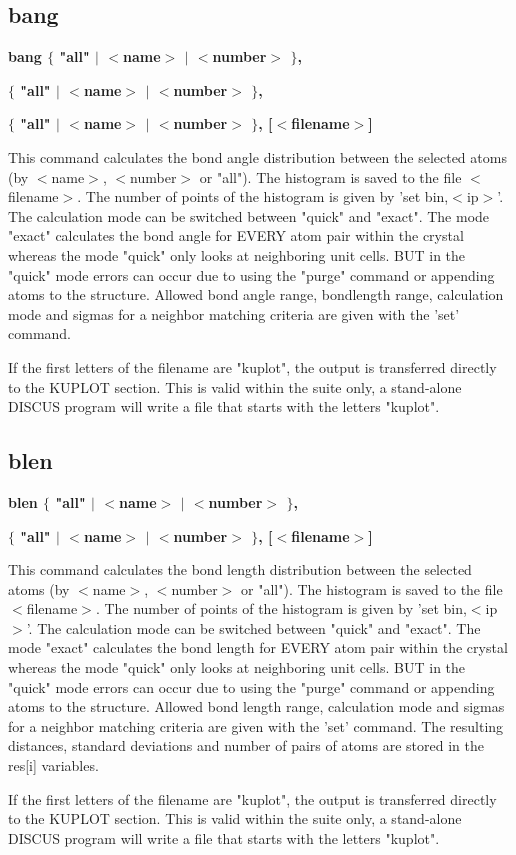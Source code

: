 \subsection*{bang}
{\bf bang $ \{$ "all" $| $ $ <$name$> $ $| $ $ <$number$> $ $\} $, \par }
{\bf      $ \{$ "all" $| $ $ <$name$> $ $| $ $ <$number$> $ $\} $, \par }
{\bf      $ \{$ "all" $| $ $ <$name$> $ $| $ $ <$number$> $ $\} $, [$ <$filename$> $] \par }
\par
\vspace{3pt}
This command calculates the bond angle distribution between the 
selected atoms (by $ <$name$> $, $ <$number$> $ or "all"). The histogram 
is saved to the file $ <$filename$> $. The number of points of the 
histogram is given by 'set bin,$ <$ip$> $'. The calculation mode 
can be switched between "quick" and "exact". The mode "exact" 
calculates the bond angle for EVERY atom pair within the crystal 
whereas the mode "quick" only looks at neighboring unit cells. 
BUT in the "quick" mode errors can occur due to using the "purge" 
command or appending atoms to the structure. 
Allowed bond angle range, bondlength range, calculation mode and 
sigmas for a neighbor matching criteria are given with the 
'set' command. 
\par
If the first letters of the filename are "kuplot", the output 
is transferred directly to the KUPLOT section. This is valid 
within the suite only, a stand-alone DISCUS program will write a 
file that starts with the letters "kuplot". 
\subsection*{blen}
{\bf blen $ \{$ "all" $| $ $ <$name$> $ $| $ $ <$number$> $ $\} $, \par }
{\bf      $ \{$ "all" $| $ $ <$name$> $ $| $ $ <$number$> $ $\} $, [$ <$filename$> $] \par }
\par
\vspace{3pt}
This command calculates the bond length distribution between the 
selected atoms (by $ <$name$> $, $ <$number$> $ or "all"). The histogram 
is saved to the file $ <$filename$> $. The number of points of the 
histogram is given by 'set bin,$ <$ip$> $'. The calculation mode 
can be switched between "quick" and "exact". The mode "exact" 
calculates the bond length for EVERY atom pair within the crystal 
whereas the mode "quick" only looks at neighboring unit cells. 
BUT in the "quick" mode errors can occur due to using the "purge" 
command or appending atoms to the structure. 
Allowed bond length range, calculation mode and sigmas for a neighbor 
matching criteria are given with the 'set' command. 
The resulting distances, standard deviations and number of pairs 
of atoms are stored in the res[i] variables. 
\par
If the first letters of the filename are "kuplot", the output 
is transferred directly to the KUPLOT section. This is valid 
within the suite only, a stand-alone DISCUS program will write a 
file that starts with the letters "kuplot". 
